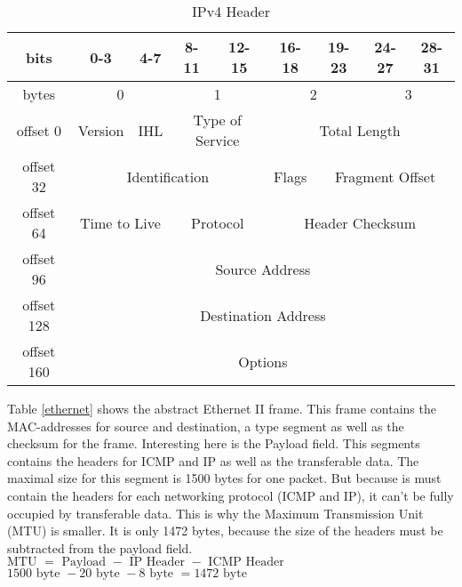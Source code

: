 \begin{table}[H]
	\centering
	\label{ipv4-header}
	\begin{tabular}{|c|c|c|c|c|c|c|c|c|}
		\hline
		bits       & 0-3               & 4-7           & 8-11             & 12-15             & 16-18  & 19-23      & 24-27      & 28-31      \\ \hline
		bytes                            & \multicolumn{2}{c|}{0}                                              & \multicolumn{2}{c|}{1}                                               & \multicolumn{2}{c|}{2}& \multicolumn{2}{c|}{3}\\ \hline
		offset 0   & Version           & IHL           & \multicolumn{2}{c|}{Type of Service} & \multicolumn{4}{c|}{Total Length}             \\ \hline
		offset 32  & \multicolumn{4}{c|}{Identification}                                      & Flags  & \multicolumn{3}{c|}{Fragment Offset} \\ \hline
		offset 64  & \multicolumn{2}{c|}{Time to Live} & \multicolumn{2}{c|}{Protocol}        & \multicolumn{4}{c|}{Header Checksum}          \\ \hline
		offset 96  & \multicolumn{8}{c|}{Source Address}                                                                                      \\ \hline
		offset 128 & \multicolumn{8}{c|}{Destination Address}                                                                                 \\ \hline
		offset 160 & \multicolumn{8}{c|}{Options}                                                                                             \\ \hline
	\end{tabular}
	\caption{IPv4 Header}
\end{table}

Table \ref{ethernet} shows the abstract Ethernet II frame. This frame contains the MAC-addresses for source and destination, a type segment as well as the checksum for the frame. Interesting here is the Payload field. This segments contains the headers for ICMP and IP as well as the transferable data. The maximal size for this segment is 1500 bytes for one packet. But because is must contain the headers for each networking protocol (ICMP and IP), it can't be fully occupied by transferable data. This is why the Maximum Transmission Unit (MTU) is smaller. It is only 1472 bytes, because the size of the headers must be subtracted from the payload field.
$ \text{MTU } = \text{ Payload } - \text{ IP Header } - \text{ ICMP Header }$\\
$ 1500\text{ byte } - 20 \text{ byte } - 8 \text{ byte } = 1472 \text{ byte }$


